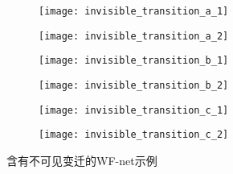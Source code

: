 \begin{figure}[htbp]
  \centering
  \begin{subfigure}{1\textwidth}
    \centering
    \begin{minipage}[b]{0.45\textwidth}
      \centering
      \texttt{[image: invisible\_transition\_a\_1]}
    \end{minipage}
    \hspace{1em}
    \begin{minipage}[b]{0.45\textwidth}
      \centering
      \texttt{[image: invisible\_transition\_a\_2]}
    \end{minipage}
    \caption{}
    \label{fig:invisible_transition_a}
  \end{subfigure}
  \begin{subfigure}{1\textwidth}
    \vspace{1em}
    \centering
    \begin{minipage}[]{0.45\textwidth}
      \centering
      \texttt{[image: invisible\_transition\_b\_1]}
    \end{minipage}
    \hspace{1em}
    \begin{minipage}[]{0.45\textwidth}
      \centering
      \texttt{[image: invisible\_transition\_b\_2]}
    \end{minipage}
    \caption{}
    \label{fig:invisible_transition_b}
  \end{subfigure}
  \begin{subfigure}{1\textwidth}
    \vspace{1em}
    \centering
    \begin{minipage}[]{0.45\textwidth}
      \centering
      \texttt{[image: invisible\_transition\_c\_1]}
    \end{minipage}
    \hspace{1em}
    \begin{minipage}[]{0.45\textwidth}
      \centering
      \texttt{[image: invisible\_transition\_c\_2]}
    \end{minipage}
    \caption{}
    \label{fig:invisible_transition_c}
  \end{subfigure}
  \vspace{6pt}
  \caption{含有不可见变迁的WF-net示例}
  \label{fig:invisible_transition_examples}
\end{figure}

